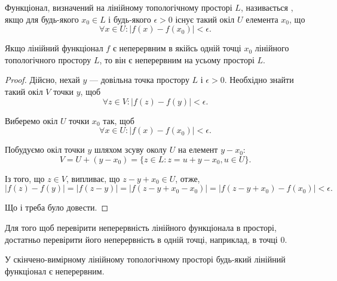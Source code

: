 \begin{definition}
Функціонал, визначений на лінійному
топологічному просторі $L$, називається , якщо
для будь-якого $x_0 \in L$ і будь-якого $\epsilon > 0$ існує такий окіл $U$
елемента $x_0$, що
\begin{equation*}
    \forall x \in U: |f(x) - f(x_0)| < \epsilon.
\end{equation*}
\end{definition}

\begin{lemma}
Якщо лінійний функціонал $f$ є неперервним в
якійсь одній точці $x_0$ лінійного топологічного простору $L$,
то він є неперервним на усьому просторі $L$.
\end{lemma}

\begin{proof}
Дійсно, нехай $y$ --- довільна точка простору
$L$ і $\epsilon > 0$. Необхідно знайти такий окіл $V$ точки $y$, щоб
\begin{equation*}
    \forall z \in V: |f(z) - f(y)| < \epsilon.
\end{equation*}

Виберемо окіл $U$ точки $x_0$ так, щоб
\begin{equation*}
    \forall x \in U: |f(x) - f(x_0)| < \epsilon.
\end{equation*}

Побудуємо окіл точки $y$ шляхом зсуву околу $U$ на елемент
$y - x_0$:
\begin{equation*}
    V = U + (y - x_0) = \{ z \in L: z = u + y - x_0, u \in U\}.
\end{equation*}

Із того, що $z \in V$, випливає, що $z - y + x_0 \in U$, отже,
\begin{equation*}
    |f(z) - f(y)| =
    |f(z - y)| =
    |f(z - y + x_0 - x_0)| =
    |f(z - y + x_0) - f(x_0)| < \epsilon.
\end{equation*}

Що і треба було довести. 
\end{proof}

\begin{corollary}
Для того щоб перевірити неперервність
лінійного функціонала в просторі, достатньо перевірити його
неперервність в одній точці, наприклад, в точці $0$.
\end{corollary}

\begin{remark}
У скінчено-вимірному лінійному
топологічному просторі будь-який лінійний функціонал є
неперервним.
\end{remark}

